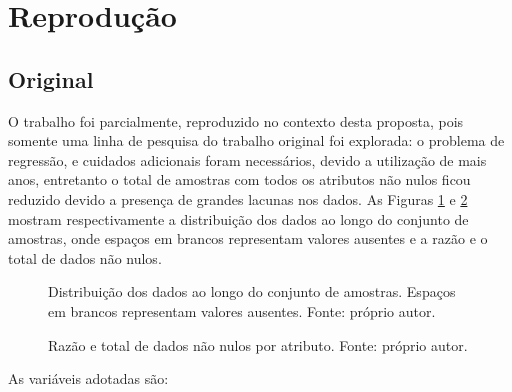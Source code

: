 \section{Reprodução}

\subsection{Original}

O trabalho \cite{REZENDE:2009} foi parcialmente, reproduzido no contexto desta proposta, pois somente uma linha de pesquisa do trabalho original foi explorada: o problema de regressão, e cuidados adicionais foram necessários, devido a utilização de mais anos, entretanto o total de amostras com todos os atributos não nulos ficou reduzido devido a presença de grandes lacunas nos dados. As Figuras \ref{fig:distribution} e \ref{fig:nulltotal} mostram respectivamente a distribuição dos dados ao longo do conjunto de amostras, onde espaços em brancos representam valores ausentes e a razão e o total de dados não nulos.

\begin{figure}[H]
\centering
{}
\caption{Distribuição dos dados ao longo do conjunto de amostras. Espaços em brancos representam valores ausentes. Fonte: próprio autor.}
\label{fig:distribution}
\end{figure}

\begin{figure}[H]
\centering
{}
\caption{Razão e total de dados não nulos por atributo. Fonte: próprio autor.}
\label{fig:nulltotal}
\end{figure}


As variáveis adotadas são:


